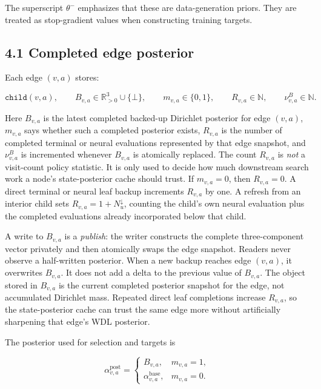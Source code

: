 \documentclass[11pt]{article}
\newcommand{\R}{\mathbb{R}}
\begin{document}
The superscript \(\theta^-\) emphasizes that these are data-generation priors.
They are treated as stop-gradient values when constructing training targets.

\subsection*{4.1 Completed edge posterior}

Each edge \((v,a)\) stores:

\[
\texttt{child}(v,a),
\qquad
B_{v,a}\in\R_{>0}^{3}\cup\{\bot\},
\qquad
m_{v,a}\in\{0,1\},
\qquad
R_{v,a}\in\mathbb{N},
\qquad
\nu^B_{v,a}\in\mathbb{N}.
\]

Here \(B_{v,a}\) is the latest completed backed-up Dirichlet posterior for edge
\((v,a)\), \(m_{v,a}\) says whether such a completed posterior exists,
\(R_{v,a}\) is the number of completed terminal or neural evaluations represented
by that edge snapshot, and \(\nu^B_{v,a}\) is incremented whenever \(B_{v,a}\) is
atomically replaced. The count \(R_{v,a}\) is \emph{not} a visit-count policy
statistic. It is only used to decide how much downstream search work a node's
state-posterior cache should trust. If \(m_{v,a}=0\), then \(R_{v,a}=0\).
A direct terminal or neural leaf backup increments \(R_{v,a}\) by one. A refresh
from an interior child sets \(R_{v,a}=1+N^\downarrow_u\), counting the child's own
neural evaluation plus the completed evaluations already incorporated below that
child.

A write to \(B_{v,a}\) is a \emph{publish}: the writer constructs the complete
three-component vector privately and then atomically swaps the edge snapshot.
Readers never observe a half-written posterior. When a new backup reaches edge
\((v,a)\), it overwrites \(B_{v,a}\). It does not add a delta to the previous
value of \(B_{v,a}\). The object stored in \(B_{v,a}\) is the current completed
posterior snapshot for the edge, not accumulated Dirichlet mass. Repeated direct
leaf completions increase \(R_{v,a}\), so the state-posterior cache can trust the
same edge more without artificially sharpening that edge's WDL posterior.

The posterior used for selection and targets is

\[
\alpha^{\mathrm{post}}_{v,a}
=
\begin{cases}
B_{v,a},
& m_{v,a}=1,\\[3pt]
\alpha^{\mathrm{base}}_{v,a},
& m_{v,a}=0.
\end{cases}
\]
\end{document}

